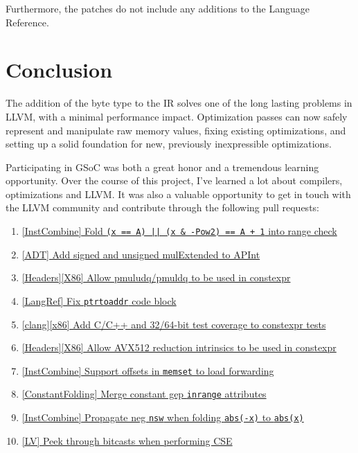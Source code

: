 \documentclass[a4paper,12pt]{article}
\begin{document}
Furthermore, the patches do not include any additions to the Language Reference.

\section{Conclusion}

The addition of the byte type to the IR solves one of the long lasting problems in LLVM, with a minimal performance impact.
Optimization passes can now safely represent and manipulate raw memory values, fixing existing optimizations, and setting up a solid foundation for new, previously inexpressible optimizations.

Participating in GSoC was both a great honor and a tremendous learning opportunity.
Over the course of this project, I've learned a lot about compilers, optimizations and LLVM.
It was also a valuable opportunity to get in touch with the LLVM community and contribute through the following pull requests:

\begin{enumerate}[itemsep=0.5ex, topsep=0.5ex, parsep=0pt]
  \item \href{https://github.com/llvm/llvm-project/pull/153842}{[InstCombine] Fold \texttt{(x == A) || (x \& -Pow2) == A + 1} into range check}
  \item \href{https://github.com/llvm/llvm-project/pull/153399}{[ADT] Add signed and unsigned mulExtended to APInt}
  \item \href{https://github.com/llvm/llvm-project/pull/153293}{[Headers][X86] Allow pmuludq/pmuldq to be used in constexpr}
  \item \href{https://github.com/llvm/llvm-project/pull/152927}{[LangRef] Fix \texttt{ptrtoaddr} code block}
  \item \href{https://github.com/llvm/llvm-project/pull/152478}{[clang][x86] Add C/C++ and 32/64-bit test coverage to constexpr tests}
  \item \href{https://github.com/llvm/llvm-project/pull/152363}{[Headers][X86] Allow AVX512 reduction intrinsics to be used in constexpr}
  \item \href{https://github.com/llvm/llvm-project/pull/151924}{[InstCombine] Support offsets in \texttt{memset} to load forwarding}
  \item \href{https://github.com/llvm/llvm-project/pull/150546}{[ConstantFolding] Merge constant gep \texttt{inrange} attributes}
  \item \href{https://github.com/llvm/llvm-project/pull/150460}{[InstCombine] Propagate neg \texttt{nsw} when folding \texttt{abs(-x)} to \texttt{abs(x)}}
  \item \href{https://github.com/llvm/llvm-project/pull/146856}{[LV] Peek through bitcasts when performing CSE}
\end{enumerate}
\end{document}
